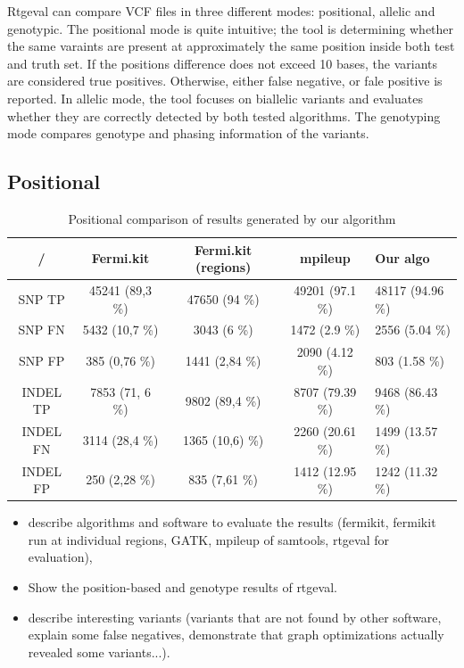 Rtgeval can compare VCF files in three different modes: positional, allelic and genotypic. The positional mode is quite intuitive; the tool is determining whether the same varaints are present at approximately the same position inside both test and truth set. If the positions difference does not exceed 10 bases, the variants are considered true positives. Otherwise, either false negative, or fale positive is reported. In allelic mode, the tool focuses on biallelic variants and evaluates whether they are correctly detected by both tested algorithms. The genotyping mode compares genotype and phasing information of the variants.

\subsection{Positional}
\label{subsec:positional-results}

\begin{table}[h]
\begin{center}
\caption{Positional comparison of results generated by our algorithm}
\label{tab:positional-results}
\begin{tabular}{| c | c | c | c | p{3cm} |}
\hline
/ & Fermi.kit & Fermi.kit (regions) & mpileup & Our algo \\
\hline
SNP TP & 45241 (89,3 \%) & 47650 (94 \%) & 49201 (97.1 \%) & 48117 (94.96 \%) \\
\hline
SNP FN & 5432 (10,7 \%) & 3043 (6 \%) & 1472 (2.9 \%) & 2556 (5.04 \%) \\
\hline
SNP FP & 385 (0,76 \%) & 1441 (2,84 \%) & 2090 (4.12 \%) & 803 (1.58 \%) \\
\hline
INDEL TP & 7853 (71, 6 \%) & 9802 (89,4 \%) & 8707 (79.39 \%) & 9468 (86.43 \%) \\
\hline
INDEL FN & 3114 (28,4 \%) & 1365 (10,6) \%) & 2260 (20.61 \%) & 1499 (13.57 \%) \\
\hline
INDEL FP & 250 (2,28 \%) & 835 (7,61 \%) & 1412 (12.95 \%) & 1242 (11.32 \%) \\
\hline
\end{tabular}
\end{center}
\end{table}

\begin{itemize}
\item describe algorithms and software to evaluate the results (fermikit, fermikit run at individual regions, GATK, mpileup of samtools, rtgeval for evaluation),
\item Show the position-based and genotype results of rtgeval.
\item describe interesting variants (variants that are not found by other software, explain some false negatives, demonstrate that graph optimizations actually revealed some variants...).
\end{itemize}
